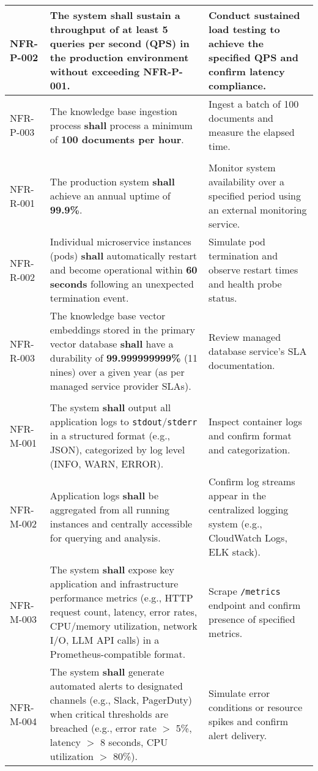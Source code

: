 \documentclass[a4paper,10pt]{article}
\begin{document}
\begin{longtable}{|>{\raggedright\arraybackslash}p{1.2cm}|>{\raggedright\arraybackslash}p{7cm}|>{\raggedright\arraybackslash}p{6.5cm}|}
\hline
NFR-P-002 & The system \textbf{shall} sustain a throughput of at least \textbf{5 queries per second (QPS)} in the production environment without exceeding NFR-P-001. & Conduct sustained load testing to achieve the specified QPS and confirm latency compliance. \\
\hline
NFR-P-003 & The knowledge base ingestion process \textbf{shall} process a minimum of \textbf{100 documents per hour}. & Ingest a batch of 100 documents and measure the elapsed time. \\
\hline
\multicolumn{3}{|l|}{\textbf{2.2. Reliability and Availability}} \\
\hline
NFR-R-001 & The production system \textbf{shall} achieve an annual uptime of \textbf{99.9\%}. & Monitor system availability over a specified period using an external monitoring service. \\
\hline
NFR-R-002 & Individual microservice instances (pods) \textbf{shall} automatically restart and become operational within \textbf{60 seconds} following an unexpected termination event. & Simulate pod termination and observe restart times and health probe status. \\
\hline
NFR-R-003 & The knowledge base vector embeddings stored in the primary vector database \textbf{shall} have a durability of \textbf{99.999999999\%} (11 nines) over a given year (as per managed service provider SLAs). & Review managed database service's SLA documentation. \\
\hline
\multicolumn{3}{|l|}{\textbf{2.3. Maintainability and Operability}} \\
\hline
NFR-M-001 & The system \textbf{shall} output all application logs to \texttt{stdout}/\texttt{stderr} in a structured format (e.g., JSON), categorized by log level (INFO, WARN, ERROR). & Inspect container logs and confirm format and categorization. \\
\hline
NFR-M-002 & Application logs \textbf{shall} be aggregated from all running instances and centrally accessible for querying and analysis. & Confirm log streams appear in the centralized logging system (e.g., CloudWatch Logs, ELK stack). \\
\hline
NFR-M-003 & The system \textbf{shall} expose key application and infrastructure performance metrics (e.g., HTTP request count, latency, error rates, CPU/memory utilization, network I/O, LLM API calls) in a Prometheus-compatible format. & Scrape \texttt{/metrics} endpoint and confirm presence of specified metrics. \\
\hline
NFR-M-004 & The system \textbf{shall} generate automated alerts to designated channels (e.g., Slack, PagerDuty) when critical thresholds are breached (e.g., error rate $>$ 5\%, latency $>$ 8 seconds, CPU utilization $>$ 80\%). & Simulate error conditions or resource spikes and confirm alert delivery. \\

\end{longtable}
\end{document}
